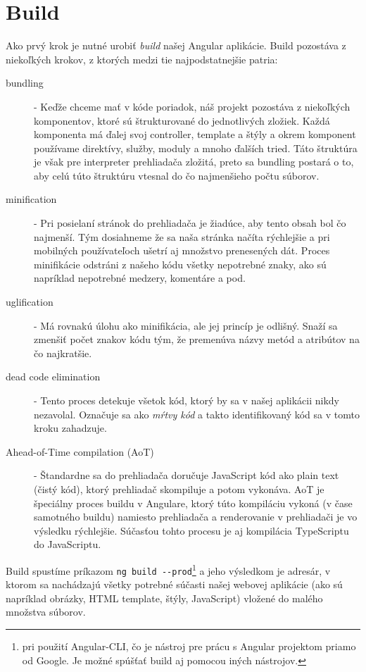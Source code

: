 \documentclass[
  printed, %
  twoside, %
  notable,   %
  nolof,   %
  nolot,   %
]{fithesis3}
\begin{document}
\section{Build}
Ako prvý krok je nutné urobiť \textit{build} našej Angular aplikácie. Build pozostáva z niekoľkých krokov, z ktorých medzi tie najpodstatnejšie patria:
\begin{description}
\item[bundling] - Keďže chceme mať v kóde poriadok, náš projekt pozostáva z niekoľkých komponentov, ktoré sú štrukturované do jednotlivých zložiek. Každá komponenta má ďalej svoj controller, template a štýly a okrem komponent používame direktívy, služby, moduly a mnoho ďalších tried. Táto štruktúra je však pre interpreter prehliadača zložitá, preto sa bundling postará o to, aby celú túto štruktúru vtesnal do čo najmenšieho počtu súborov.
\item[minification] - Pri posielaní stránok do prehliadača je žiadúce, aby tento obsah bol čo najmenší. Tým dosiahneme že sa naša stránka načíta rýchlejšie a pri mobilných používateľoch ušetrí aj množstvo prenesených dát. Proces minifikácie odstráni z našeho kódu všetky nepotrebné znaky, ako sú napríklad nepotrebné medzery, komentáre a pod.
\item[uglification] - Má rovnakú úlohu ako minifikácia, ale jej princíp je odlišný. Snaží sa zmenšiť počet znakov kódu tým, že premenúva názvy metód a atribútov na čo najkratšie.
\item[dead code elimination] - Tento proces detekuje všetok kód, ktorý by sa v našej aplikácii nikdy nezavolal. Označuje sa ako \textit{mŕtvy kód} a takto identifikovaný kód sa v tomto kroku zahadzuje.
\item[Ahead-of-Time compilation (AoT)] - Štandardne sa do prehliadača doručuje JavaScript kód ako plain text (čistý kód), ktorý prehliadač skompiluje a potom vykonáva. AoT je špeciálny proces buildu v Angulare, ktorý túto kompiláciu vykoná (v čase samotného buildu) namiesto prehliadača a renderovanie v prehliadači je vo výsledku rýchlejšie. Súčasťou tohto procesu je aj kompilácia TypeScriptu do JavaScriptu.
\end{description}

Build spustíme príkazom \texttt{ng build -{}-prod}\footnote{pri použití Angular-CLI, čo je nástroj pre prácu s Angular projektom priamo od Google. Je možné spúšťať build aj pomocou iných nástrojov.} a jeho výsledkom je adresár, v ktorom sa nachádzajú všetky potrebné súčasti našej webovej aplikácie (ako sú napríklad obrázky, HTML template, štýly, JavaScript) vložené do malého množstva súborov.
\end{document}
